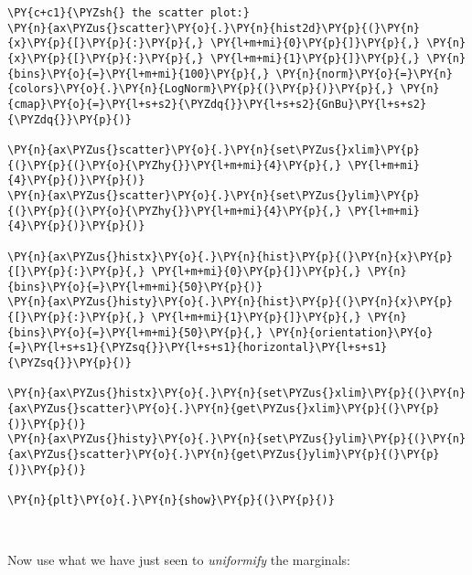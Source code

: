 \begin{tcolorbox}[breakable, size=fbox, boxrule=1pt, pad at break*=1mm,colback=cellbackground, colframe=cellborder]
\begin{Verbatim}[commandchars=\\\{\}]
\PY{c+c1}{\PYZsh{} the scatter plot:}
\PY{n}{ax\PYZus{}scatter}\PY{o}{.}\PY{n}{hist2d}\PY{p}{(}\PY{n}{x}\PY{p}{[}\PY{p}{:}\PY{p}{,} \PY{l+m+mi}{0}\PY{p}{]}\PY{p}{,} \PY{n}{x}\PY{p}{[}\PY{p}{:}\PY{p}{,} \PY{l+m+mi}{1}\PY{p}{]}\PY{p}{,} \PY{n}{bins}\PY{o}{=}\PY{l+m+mi}{100}\PY{p}{,} \PY{n}{norm}\PY{o}{=}\PY{n}{colors}\PY{o}{.}\PY{n}{LogNorm}\PY{p}{(}\PY{p}{)}\PY{p}{,} \PY{n}{cmap}\PY{o}{=}\PY{l+s+s2}{\PYZdq{}}\PY{l+s+s2}{GnBu}\PY{l+s+s2}{\PYZdq{}}\PY{p}{)}

\PY{n}{ax\PYZus{}scatter}\PY{o}{.}\PY{n}{set\PYZus{}xlim}\PY{p}{(}\PY{p}{(}\PY{o}{\PYZhy{}}\PY{l+m+mi}{4}\PY{p}{,} \PY{l+m+mi}{4}\PY{p}{)}\PY{p}{)}
\PY{n}{ax\PYZus{}scatter}\PY{o}{.}\PY{n}{set\PYZus{}ylim}\PY{p}{(}\PY{p}{(}\PY{o}{\PYZhy{}}\PY{l+m+mi}{4}\PY{p}{,} \PY{l+m+mi}{4}\PY{p}{)}\PY{p}{)}

\PY{n}{ax\PYZus{}histx}\PY{o}{.}\PY{n}{hist}\PY{p}{(}\PY{n}{x}\PY{p}{[}\PY{p}{:}\PY{p}{,} \PY{l+m+mi}{0}\PY{p}{]}\PY{p}{,} \PY{n}{bins}\PY{o}{=}\PY{l+m+mi}{50}\PY{p}{)}
\PY{n}{ax\PYZus{}histy}\PY{o}{.}\PY{n}{hist}\PY{p}{(}\PY{n}{x}\PY{p}{[}\PY{p}{:}\PY{p}{,} \PY{l+m+mi}{1}\PY{p}{]}\PY{p}{,} \PY{n}{bins}\PY{o}{=}\PY{l+m+mi}{50}\PY{p}{,} \PY{n}{orientation}\PY{o}{=}\PY{l+s+s1}{\PYZsq{}}\PY{l+s+s1}{horizontal}\PY{l+s+s1}{\PYZsq{}}\PY{p}{)}

\PY{n}{ax\PYZus{}histx}\PY{o}{.}\PY{n}{set\PYZus{}xlim}\PY{p}{(}\PY{n}{ax\PYZus{}scatter}\PY{o}{.}\PY{n}{get\PYZus{}xlim}\PY{p}{(}\PY{p}{)}\PY{p}{)}
\PY{n}{ax\PYZus{}histy}\PY{o}{.}\PY{n}{set\PYZus{}ylim}\PY{p}{(}\PY{n}{ax\PYZus{}scatter}\PY{o}{.}\PY{n}{get\PYZus{}ylim}\PY{p}{(}\PY{p}{)}\PY{p}{)}

\PY{n}{plt}\PY{o}{.}\PY{n}{show}\PY{p}{(}\PY{p}{)}
\end{Verbatim}
\end{tcolorbox}

    \begin{center}
    \end{center}
    { \hspace*{\fill} \\}
    
    Now use what we have just seen to \emph{uniformify} the marginals:

